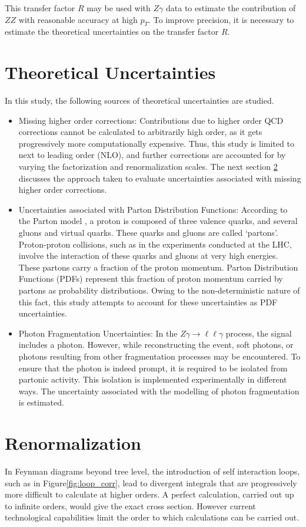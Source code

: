 \documentclass[12pt,a4paper,openright,twoside]{report}
\newcommand{\Zg}{$Z\gamma\to \ell\ell\gamma$ }
\begin{document}
This transfer factor $R$ may be used with $Z\gamma$ data to estimate the contribution of $ZZ$ with reasonable accuracy at high $p_T$. To improve precision, it is necessary to estimate the theoretical uncertainties on the transfer factor $R$.

\section{Theoretical Uncertainties}
In this study, the following sources of theoretical uncertainties are studied.
\begin{itemize}
\item Missing higher order corrections: Contributions due to higher order QCD corrections cannot be calculated to arbitrarily high order, as it gets progressively more computationally expensive. Thus, this study is limited to next to leading order (NLO), and further corrections are accounted for by varying the factorization and renormalization scales. The next section \ref{sec:renorm} discusses the approach taken to evaluate uncertainties associated with missing higher order corrections.

\item Uncertainties associated with Parton Distribution Functions: According to the Parton model \cite{parton_model}, a proton is composed of three valence quarks, and several gluons and virtual quarks. These quarks and gluons are called `partons'. Proton-proton collisions, such as in the experiments conducted at the LHC, involve the interaction of these quarks and gluons at very high energies. These partons carry a fraction of the proton momentum. Parton Distribution Functions (PDFs) represent this fraction of proton momentum carried by partons as probability distributions. Owing to the non-deterministic nature of this fact, this study attempts to account for these uncertainties as PDF uncertainties.

\item Photon Fragmentation Uncertainties: In the \Zg process, the signal includes a photon. However, while reconstructing the event, soft photons, or photons resulting from other fragmentation processes may be encountered. To ensure that the photon is indeed prompt, it is required to be isolated from partonic activity. This isolation is implemented experimentally in different ways. The uncertainty associated with the modelling of photon fragmentation is estimated.
\end{itemize}

\section{Renormalization}\label{sec:renorm}
In Feynman diagrams beyond tree level, the introduction of self interaction loops, such as in Figure\ref{fig:loop_corr}, lead to divergent integrals that are progressively more difficult to calculate at higher orders. A perfect calculation, carried out up to infinite orders, would give the exact cross section. However current technological capabilities limit the order to which calculations can be carried out.
\end{document}
